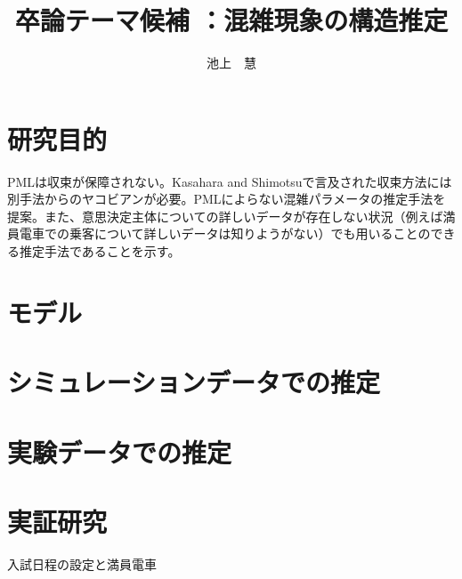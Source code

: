 \documentclass{jsarticle}
\begin{document}
\title{卒論テーマ候補 ：混雑現象の構造推定}
\author{池上　慧}
\maketitle

\section{研究目的}
PMLは収束が保障されない。Kasahara and Shimotsuで言及された収束方法には別手法からのヤコビアンが必要。PMLによらない混雑パラメータの推定手法を提案。また、意思決定主体についての詳しいデータが存在しない状況（例えば満員電車での乗客について詳しいデータは知りようがない）でも用いることのできる推定手法であることを示す。

\section{モデル}

\section{シミュレーションデータでの推定}

\section{実験データでの推定}

\section{実証研究}
入試日程の設定と満員電車
\end{document}
